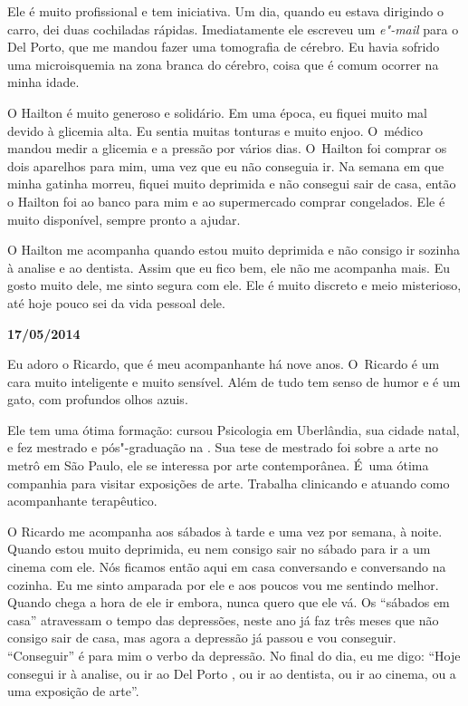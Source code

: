 Ele é muito profissional e tem iniciativa. Um dia, quando eu estava
dirigindo o carro, dei duas cochiladas rápidas. Imediatamente ele
escreveu um \emph{e"-mail} para o Del Porto, que me mandou fazer uma
tomografia de cérebro. Eu havia sofrido uma microisquemia na zona branca
do cérebro, coisa que é comum ocorrer na minha idade.

O Hailton é muito generoso e solidário. Em uma época, eu fiquei muito
mal devido à glicemia alta. Eu sentia muitas tonturas e muito enjoo. O~médico mandou medir a glicemia e a pressão por vários dias. O~Hailton
foi comprar os dois aparelhos para mim, uma vez que eu não conseguia ir.
Na semana em que minha gatinha morreu, fiquei muito deprimida e não
consegui sair de casa, então o Hailton foi ao banco para mim e ao
supermercado comprar congelados. Ele é muito disponível, sempre pronto a
ajudar.

O Hailton me acompanha quando estou muito deprimida e não consigo ir
sozinha à analise e ao dentista. Assim que eu fico bem, ele não me
acompanha mais. Eu gosto muito dele, me sinto segura com ele. Ele é
muito discreto e meio misterioso, até hoje pouco sei da vida pessoal
dele.

\begin{center}\asterisc{}\end{center}

\begin{flushright}\textbf{17/05/2014}\end{flushright}


Eu adoro o Ricardo, que é meu acompanhante há nove anos. O~Ricardo é um
cara muito inteligente e muito sensível. Além de tudo tem senso de humor
e é um gato, com profundos olhos azuis.

Ele tem uma ótima formação: cursou Psicologia em Uberlândia, sua cidade
natal, e fez mestrado e pós"-graduação na . Sua tese de mestrado foi
sobre a arte no metrô em São Paulo, ele se interessa por arte
contemporânea. É~uma ótima companhia para visitar exposições de arte.
Trabalha clinicando e atuando como acompanhante terapêutico.

O Ricardo me acompanha aos sábados à tarde e uma vez por semana, à
noite. Quando estou muito deprimida, eu nem consigo sair no sábado para
ir a um cinema com ele. Nós ficamos então aqui em casa conversando e
conversando na cozinha. Eu me sinto amparada por ele e aos poucos vou me
sentindo melhor. Quando chega a hora de ele ir embora, nunca quero que
ele vá. Os ``sábados em casa'' atravessam o tempo das depressões, neste
ano já faz três meses que não consigo sair de casa, mas agora a
depressão já passou e vou conseguir. ``Conseguir'' é para mim o verbo da
depressão. No final do dia, eu me digo: ``Hoje consegui ir à analise, ou
ir ao Del Porto , ou ir ao dentista, ou ir ao cinema, ou a uma exposição
de arte''.


